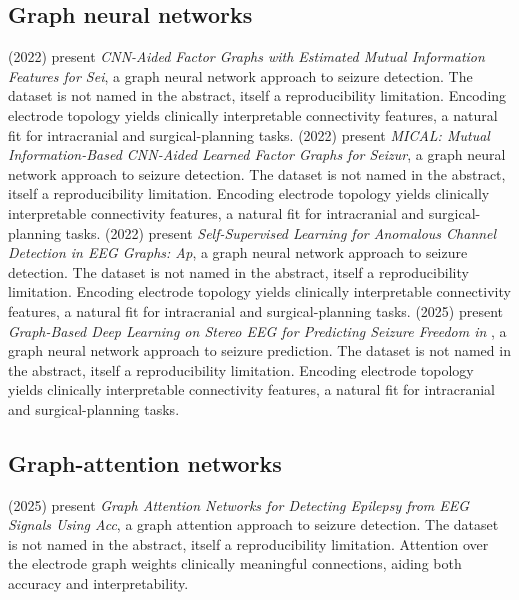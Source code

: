 \subsection{Graph neural networks}
\citet{ep220305950} (2022) present \emph{CNN-Aided Factor Graphs with Estimated Mutual Information Features for Sei}, a graph neural network approach to seizure detection. The dataset is not named in the abstract, itself a reproducibility limitation. Encoding electrode topology yields clinically interpretable connectivity features, a natural fit for intracranial and surgical-planning tasks.
\citet{ep220602298} (2022) present \emph{MICAL: Mutual Information-Based CNN-Aided Learned Factor Graphs for Seizur}, a graph neural network approach to seizure detection. The dataset is not named in the abstract, itself a reproducibility limitation. Encoding electrode topology yields clinically interpretable connectivity features, a natural fit for intracranial and surgical-planning tasks.
\citet{ep220807448} (2022) present \emph{Self-Supervised Learning for Anomalous Channel Detection in EEG Graphs: Ap}, a graph neural network approach to seizure detection. The dataset is not named in the abstract, itself a reproducibility limitation. Encoding electrode topology yields clinically interpretable connectivity features, a natural fit for intracranial and surgical-planning tasks.
\citet{ep250215198} (2025) present \emph{Graph-Based Deep Learning on Stereo EEG for Predicting Seizure Freedom in }, a graph neural network approach to seizure prediction. The dataset is not named in the abstract, itself a reproducibility limitation. Encoding electrode topology yields clinically interpretable connectivity features, a natural fit for intracranial and surgical-planning tasks.

\subsection{Graph-attention networks}
\citet{ep250715118} (2025) present \emph{Graph Attention Networks for Detecting Epilepsy from EEG Signals Using Acc}, a graph attention approach to seizure detection. The dataset is not named in the abstract, itself a reproducibility limitation. Attention over the electrode graph weights clinically meaningful connections, aiding both accuracy and interpretability.

